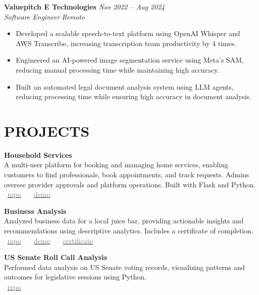 \documentclass[11pt,a4paper]{article}
\begin{document}
\textbf{Valuepitch E Technologies} \hfill \textit{Nov 2022 -- Aug 2024} \\
\textit{Software Engineer} \hfill \textit{Remote} \begin{itemize}[leftmargin=*]
    \item Developed a scalable speech-to-text platform using OpenAI Whisper and AWS Transcribe, increasing transcription team productivity by 4 times.
    \item Engineered an AI-powered image segmentation service using Meta's SAM, reducing manual processing time while maintaining high accuracy.
    \item Built an automated legal document analysis system using LLM agents, reducing processing time while ensuring high accuracy in document analysis.
\end{itemize}

\section*{PROJECTS}

\textbf{Household Services} \\
A multi-user platform for booking and managing home services, enabling customers to find professionals, book appointments, and track requests. Admins oversee provider approvals and platform operations. Built with Flask and Python. \\
\faGithub~\href{https://github.com/21f1006194/Household-Services}{\textcolor{gray}{repo}} \, \textbar{} \,
\faPlayCircle~\href{https://www.youtube.com/watch?v=FHMdtaLWznI}{\textcolor{gray}{demo}} 

\textbf{Business Analysis} \\
Analyzed business data for a local juice bar, providing actionable insights and recommendations using descriptive analytics. Includes a certificate of completion. \\
\faGithub~\href{https://github.com/jishnujp/avocado-analysis}{\textcolor{gray}{repo}} \, \textbar{} \,
\faPlayCircle~\href{https://www.youtube.com/watch?v=u5RuEhBsXKg}{\textcolor{gray}{demo}} \, \textbar{} \,
\faFilePdfO~\href{https://raw.githubusercontent.com/jishnujp/avocado-analysis/main/public/certificate.pdf}{\textcolor{gray}{certificate}} 

\textbf{US Senate Roll Call Analysis} \\
Performed data analysis on US Senate voting records, visualizing patterns and outcomes for legislative sessions using Python. \\
\faGithub~\href{https://github.com/jishnujp/US_senate_roll_call}{\textcolor{gray}{repo}} 
\end{document}
